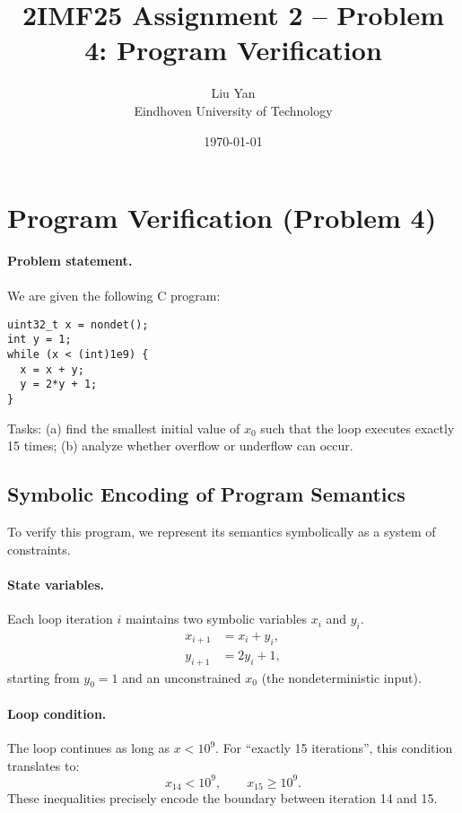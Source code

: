 \documentclass[a4paper,11pt]{article}
\begin{document}
\title{2IMF25 Assignment 2 – Problem 4: Program Verification}
\author{Liu Yan  \\ Eindhoven University of Technology}
\date{\today}
\maketitle

\section{Program Verification (Problem 4)}

\textbf{Problem statement.}\\\\
We are given the following C program:
\begin{verbatim}
uint32_t x = nondet();
int y = 1;
while (x < (int)1e9) {
  x = x + y;
  y = 2*y + 1;
}
\end{verbatim}
Tasks:
(a) find the smallest initial value of \(x_0\) such that the loop executes exactly 15 times;
(b) analyze whether overflow or underflow can occur.

\subsection*{Symbolic Encoding of Program Semantics}

To verify this program, we represent its semantics symbolically as a system of constraints.

\paragraph{State variables.}
Each loop iteration \(i\) maintains two symbolic variables \(x_i\) and \(y_i\).
\begin{align*}
x_{i+1} &= x_i + y_i,\\
y_{i+1} &= 2y_i + 1,
\end{align*}
starting from \(y_0 = 1\) and an unconstrained \(x_0\) (the nondeterministic input).

\paragraph{Loop condition.}
The loop continues as long as \(x < 10^9\).
For “exactly 15 iterations”, this condition translates to:
\[
x_{14} < 10^9, \qquad x_{15} \ge 10^9.
\]
These inequalities precisely encode the boundary between iteration 14 and 15.
\end{document}
